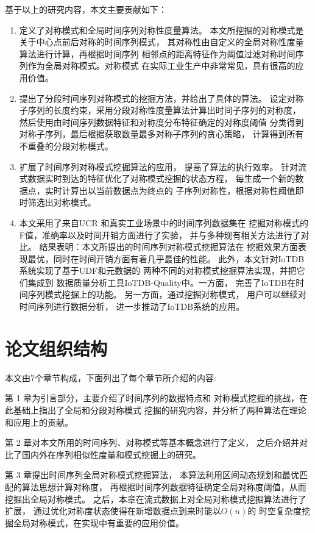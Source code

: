 基于以上的研究内容，本文主要贡献如下：
\begin{enumerate}
\item 定义了对称模式和全局时间序列对称性度量算法。
本文所挖掘的对称模式是关于中心点前后对称的时间序列模式，
其对称性由自定义的全局对称性度量算法进行计算，再根据时间序列
相邻点的距离特征作为阈值过滤对称时间序列作为全局对称模式。对称模式
在实际工业生产中非常常见，具有很高的应用价值。
\item 提出了分段时间序列对称模式的挖掘方法，并给出了具体的算法。
设定对称子序列的长度约束，采用分段对称性度量算法计算出时间子序列的对称度，
然后使用由时间序列数据特征和对称度分布特征确定的对称度阈值
分类得到对称子序列，最后根据获取数量最多对称子序列的贪心策略，
计算得到所有不重叠的分段对称模式。
\item 扩展了时间序列对称模式挖掘算法的应用，
提高了算法的执行效率。
针对流式数据实时到达的特征优化了对称模式挖掘的状态方程，
每生成一个新的数据点，实时计算出以当前数据点为终点的
子序列对称性，根据对称性阈值即时筛选出对称模式。
\item 本文采用了来自UCR\cite{DBLP:journals/ieeejas/DauBKYZGRK19}
和真实工业场景中的时间序列数据集在
挖掘对称模式的F值，准确率以及时间开销方面进行了实验，
并与多种现有相关方法进行了对比。
结果表明：本文所提出的时间序列对称模式挖掘算法在
挖掘效果方面表现最优，同时在时间开销方面有着几乎最佳的性能。
此外，本文针对IoTDB系统实现了基于UDF和元数据的
两种不同的对称模式挖掘算法实现，并把它们集成到
数据质量分析工具IoTDB-Quality中。一方面，
完善了IoTDB在时间序列模式挖掘上的功能。
另一方面，通过挖掘对称模式，
用户可以继续对时间序列进行数据分析，
进一步推动了IoTDB系统的应用。
\end{enumerate}

\section{论文组织结构}

本文由7个章节构成，下面列出了每个章节所介绍的内容:

第 1 章为引言部分，主要介绍了时间序列的数据特点和
对称模式挖掘的挑战，在此基础上指出了全局和分段对称模式
挖掘的研究内容，并分析了两种算法在理论和应用上的贡献。

第 2 章对本文所用的时间序列、对称模式等基本概念进行了定义，
之后介绍并对比了国内外在序列相似性度量和模式挖掘上的研究。

第 3 章提出时间序列全局对称模式挖掘算法，
本算法利用区间动态规划和最优匹配的算法思想计算对称度，
再根据时间序列数据特征确定全局对称度阈值，从而挖掘出全局对称模式。
之后，本章在流式数据上对全局对称模式挖掘算法进行了扩展，
通过优化对称度状态使得在新增数据点到来时能以$O(n)$的
时空复杂度挖掘全局对称模式，在实现中有重要的应用价值。

